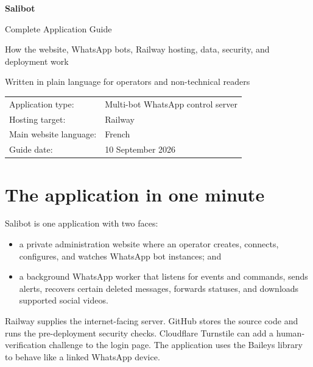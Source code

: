 \documentclass[11pt,a4paper]{article}
\begin{document}
\hypersetup{pageanchor=false}

\begin{titlepage}
\pagecolor{navy}
\color{white}
\vspace*{22mm}
{\Huge\bfseries Salibot\par}
\vspace{4mm}
{\LARGE Complete Application Guide\par}
\vspace{7mm}
{\Large How the website, WhatsApp bots, Railway hosting, data, security, and deployment work\par}
\vspace{8mm}
{\large Written in plain language for operators and non-technical readers\par}
\vfill
\begin{tabular}{ll}
Application type: & Multi-bot WhatsApp control server\\
Hosting target: & Railway\\
Main website language: & French\\
Guide date: & 10 September 2026\\
\end{tabular}
\vspace{18mm}
\end{titlepage}
\hypersetup{pageanchor=true}
\nopagecolor
\color{black}

\tableofcontents
\newpage
{}

\section{The application in one minute}

Salibot is one application with two faces:

\begin{itemize}
  \item a private administration website where an operator creates, connects, configures, and watches WhatsApp bot instances; and
  \item a background WhatsApp worker that listens for events and commands, sends alerts, recovers certain deleted messages, forwards statuses, and downloads supported social videos.
\end{itemize}

Railway supplies the internet-facing server. GitHub stores the source code and runs the pre-deployment security checks. Cloudflare Turnstile can add a human-verification challenge to the login page. The application uses the Baileys library to behave like a linked WhatsApp device.
\end{document}
